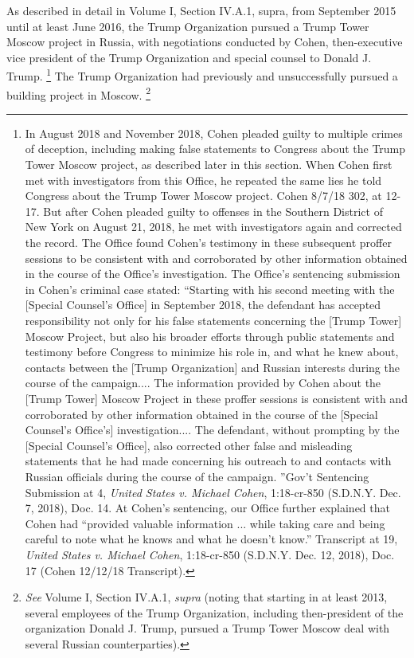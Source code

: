 {As described in detail in Volume I, Section IV.A.1, supra, from September 2015 until at least June 2016, the Trump Organization pursued a Trump Tower Moscow project in Russia, with negotiations conducted by Cohen, then-executive vice president of the Trump Organization and special counsel to Donald J. Trump.%
\footnote{In August 2018 and November 2018, Cohen pleaded guilty to multiple crimes of deception, including making false statements to Congress about the Trump Tower Moscow project, as described later in this section.
When Cohen first met with investigators from this Office, he repeated the same lies he told Congress about the Trump Tower Moscow project.
Cohen 8/7/18 302, at 12-17.
But after Cohen pleaded guilty to offenses in the Southern District of New York on August 21, 2018, he met with investigators again and corrected the record.
The Office found Cohen’s testimony in these subsequent proffer sessions to be consistent with and corroborated by other information obtained in the course of the Office’s investigation.
The Office’s sentencing submission in Cohen’s criminal case stated: “Starting with his second meeting with the [Special Counsel’s Office] in September 2018, the defendant has accepted responsibility not only for his false statements concerning the [Trump Tower] Moscow Project, but also his broader efforts through public statements and testimony before Congress to minimize his role in, and what he knew about, contacts between the [Trump Organization] and Russian interests during the course of the campaign....
The information provided by Cohen about the [Trump Tower] Moscow Project in these proffer sessions is consistent with and corroborated by other information obtained in the course of the [Special Counsel’s Office’s] investigation....
The defendant, without prompting by the [Special Counsel’s Office], also corrected other false and misleading statements that he had made concerning his outreach to and contacts with Russian officials during the course of the campaign.
”Gov’t Sentencing Submission at 4, \textit{United States v. Michael Cohen}, 1:18-cr-850 (S.D.N.Y. Dec. 7, 2018), Doc. 14.
At Cohen’s sentencing, our Office further explained that Cohen had “provided valuable information ... while taking care and being careful to note what he knows and what he doesn’t know.”
Transcript at 19, \textit{United States v. Michael Cohen}, 1:18-cr-850 (S.D.N.Y. Dec. 12, 2018), Doc. 17 (Cohen 12/12/18 Transcript).}
The Trump Organization had previously and unsuccessfully pursued a building project in Moscow.%
\footnote{\textit{See} Volume I, Section IV.A.1, \textit{supra} (noting that starting in at least 2013, several employees of the Trump Organization, including then-president of the organization Donald J. Trump, pursued a Trump Tower Moscow deal with several Russian counterparties).}
}
